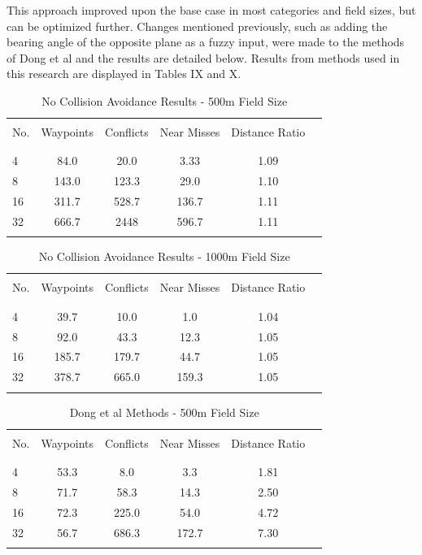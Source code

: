 \documentclass[10pt, conference, compsocconf]{IEEEtran}
\begin{document}
This approach improved upon the base case in most categories and field sizes, but can be optimized further. Changes mentioned previously, such as adding the bearing angle of the opposite plane as a fuzzy input, were made to the methods of Dong et al and the results are detailed below. Results from methods used in this research are displayed in Tables IX and X.

\begin{table}[position here!]
\centering
\caption{No Collision Avoidance Results - 500m Field Size}
\begin{tabular}{l c c c c c}
\hline
\hline
\\
No.  & Waypoints  & Conflicts & Near Misses & Distance Ratio \\
\\
\hline
\hline
\\
4 & 84.0 & 20.0 & 3.33 & 1.09 \\
8 & 143.0 & 123.3 & 29.0 & 1.10 \\
16 & 311.7 & 528.7 & 136.7 & 1.11 \\
32 & 666.7 & 2448 & 596.7 & 1.11 \\
\\
\hline
\end{tabular}
\label{tab:myfirsttable}
\end{table}

\begin{table}[position here!]
\centering
\caption{No Collision Avoidance Results - 1000m Field Size}
\begin{tabular}{l c c c c c}
\hline
\hline
\\
No.  & Waypoints  & Conflicts & Near Misses & Distance Ratio \\
\\
\hline
\hline
\\
4 & 39.7 & 10.0 & 1.0 & 1.04\\
8 & 92.0 & 43.3 & 12.3 & 1.05\\
16 & 185.7 & 179.7 & 44.7 & 1.05\\
32 & 378.7 & 665.0 & 159.3 & 1.05 \\
\\
\hline
\end{tabular}
\label{tab:myfirsttable}
\end{table}

\begin{table}[position here!]
\centering
\caption{Dong et al Methods - 500m Field Size}
\begin{tabular}{l c c c c c}
\hline
\hline
\\
No.  & Waypoints  & Conflicts & Near Misses & Distance Ratio \\
\\
\hline
\hline
\\
4 & 53.3 & 8.0 & 3.3 & 1.81 \\
8& 71.7 & 58.3 & 14.3 & 2.50 \\
16 &  72.3 & 225.0 & 54.0 & 4.72 \\
32 & 56.7 & 686.3 & 172.7 & 7.30 \\
\\
\hline
\end{tabular}
\label{tab:cc500}
\end{table}
\end{document}
